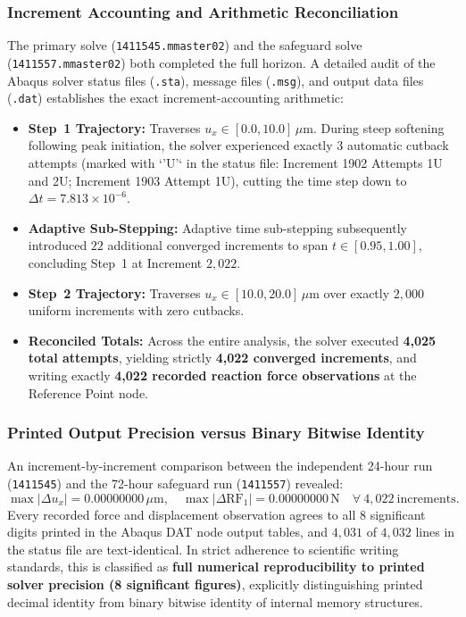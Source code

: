 \subsubsection{Increment Accounting and Arithmetic Reconciliation}
The primary solve (\texttt{1411545.mmaster02}) and the safeguard solve (\texttt{1411557.mmaster02}) both completed the full horizon. A detailed audit of the Abaqus solver status files (\nolinkurl{.sta}), message files (\nolinkurl{.msg}), and output data files (\nolinkurl{.dat}) establishes the exact increment-accounting arithmetic:
\begin{itemize}
  \item \textbf{Step~1 Trajectory:} Traverses $u_x \in [0.0, 10.0]\,\mu\mathrm{m}$. During steep softening following peak initiation, the solver experienced exactly $3$ automatic cutback attempts (marked with `'U'` in the status file: Increment 1902 Attempts 1U and 2U; Increment 1903 Attempt 1U), cutting the time step down to $\Delta t = 7.813\times 10^{-6}$.
  \item \textbf{Adaptive Sub-Stepping:} Adaptive time sub-stepping subsequently introduced $22$ additional converged increments to span $t \in [0.95, 1.00]$, concluding Step~1 at Increment $2{,}022$.
  \item \textbf{Step~2 Trajectory:} Traverses $u_x \in [10.0, 20.0]\,\mu\mathrm{m}$ over exactly $2{,}000$ uniform increments with zero cutbacks.
  \item \textbf{Reconciled Totals:} Across the entire analysis, the solver executed \textbf{4,025 total attempts}, yielding strictly \textbf{4,022 converged increments}, and writing exactly \textbf{4,022 recorded reaction force observations} at the Reference Point node.
\end{itemize}

\subsubsection{Printed Output Precision versus Binary Bitwise Identity}
An increment-by-increment comparison between the independent 24-hour run (\texttt{1411545}) and the 72-hour safeguard run (\texttt{1411557}) revealed:
\begin{equation}
  \max |\Delta u_x| = 0.00000000\,\mu\mathrm{m}, \quad \max |\Delta \mathrm{RF}_1| = 0.00000000\,\mathrm{N} \quad \forall\ 4{,}022\ \text{increments}.
  \label{eq:safeguard_identity}
\end{equation}
Every recorded force and displacement observation agrees to all $8$ significant digits printed in the Abaqus DAT node output tables, and $4{,}031$ of $4{,}032$ lines in the status file are text-identical. In strict adherence to scientific writing standards, this is classified as \textbf{full numerical reproducibility to printed solver precision (8 significant figures)}, explicitly distinguishing printed decimal identity from binary bitwise identity of internal memory structures.

